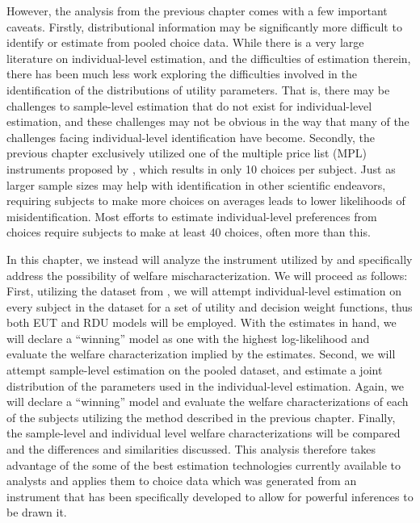 \documentclass[../main.tex]{subfiles}
\begin{document}
However, the analysis from the previous chapter comes with a few important caveats.
Firstly, distributional information may be significantly more difficult to identify or estimate from pooled choice data.
While there is a very large literature on individual-level estimation,{\footnotemark} and the difficulties of estimation therein, there has been much less work exploring the difficulties involved in the identification of the distributions of utility parameters.{\footnotemark}
That is, there may be challenges to sample-level estimation that do not exist for individual-level estimation, and these challenges may not be obvious in the way that many of the challenges facing individual-level identification have become.
Secondly, the previous chapter exclusively utilized one of the multiple price list (MPL) instruments proposed by \textcite{Holt2002}, which results in only 10 choices per subject.
Just as larger sample sizes may help with identification in other scientific endeavors, requiring subjects to make more choices on averages leads to lower likelihoods of misidentification.
Most efforts to estimate individual-level preferences from choices require subjects to make at least 40 choices, often more than this.{\footnotemark}

\addtocounter{footnote}{-1}

In this chapter, we instead will analyze the instrument utilized by \textcite{Harrison2015} and specifically address the possibility of welfare mischaracterization.
We will proceed as follows:
First, utilizing the dataset from \textcite{Harrison2015}, we will attempt individual-level estimation on every subject in the dataset for a set of utility and decision weight functions, thus both EUT and RDU models will be employed.
With the estimates in hand, we will declare a \enquote{winning} model as one with the highest log-likelihood{\footnotemark} and evaluate the welfare characterization implied by the estimates.
Second, we will attempt sample-level estimation on the pooled dataset, and estimate a joint distribution of the parameters used in the individual-level estimation.
Again, we will declare a \enquote{winning} model and evaluate the welfare characterizations of each of the subjects utilizing the method described in the previous chapter.
Finally, the sample-level and individual level welfare characterizations will be compared and the differences and similarities discussed.
This analysis therefore takes advantage of the some of the best estimation technologies currently available to analysts and applies them to choice data which was generated from an instrument that has been specifically developed to allow for powerful inferences to be drawn it.
\end{document}
